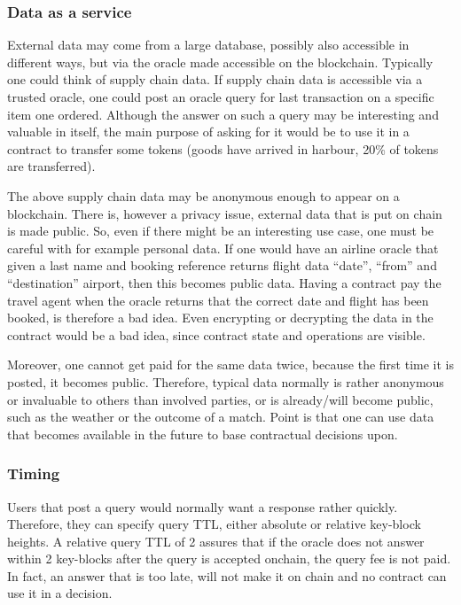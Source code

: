 \subsubsection{Data as a service}

External data may come from a large database, possibly also accessible in
different
ways, but via the oracle made accessible on the blockchain. Typically
one could think of supply chain data. If supply chain data is
accessible via a trusted oracle, one could post an oracle query for
last transaction on a specific item one ordered. Although the answer
on such a query may be interesting and valuable in itself, the main
purpose of asking for it would be to use it in a contract to transfer
some tokens (goods have arrived in harbour, 20\%  of tokens are
transferred).

The above supply chain data may be anonymous enough to appear on a
blockchain. There is, however a privacy issue, external data that is
put on chain is made public. So, even if there might be an interesting
use case, one must be careful with for example personal data. If one
would have an airline oracle that given a last name and booking
reference returns flight data ``date'', ``from'' and ``destination''
airport, then this becomes public data. Having a contract pay the
travel agent when the oracle returns that the correct date and flight has
been booked, is therefore a bad idea. Even encrypting or decrypting the
data in the contract would be a bad idea, since contract state and
operations are visible.

Moreover, one cannot get paid for the same data twice, because the
first time it is posted, it becomes public. Therefore, typical data
normally is rather anonymous or invaluable to others than involved
parties, or is already/will become public, such as the weather or the
outcome of a match. Point is that one can use data that becomes
available in the future to base contractual decisions upon.

\subsubsection{Timing}

Users that post a query would normally want a response rather
quickly. Therefore, they can specify query TTL, either absolute
or relative key-block heights. A relative query TTL of 2 assures
that if the oracle does not answer within 2 key-blocks after the query
is accepted onchain, the query fee is not paid. In fact, an answer that is too
late, will not make it on chain and no contract can use it in a
decision.

